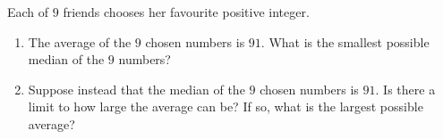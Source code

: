 Each of $9$ friends chooses her favourite positive integer.
\begin{enumerate}
\item[(a)] The average of the $9$ chosen numbers is $91$. What is the smallest possible median of the $9$ numbers?
\item[(b)] Suppose instead that the median of the $9$ chosen numbers is $91$. Is there a limit to how large the average can be? If so, what is the largest possible average?
\end{enumerate}
